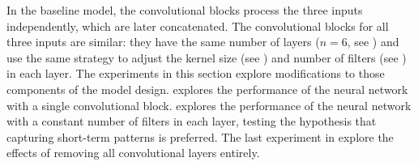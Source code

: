 
In the baseline model, the convolutional blocks process the
three inputs independently, which are later concatenated.
The convolutional blocks for all three inputs are similar:
they have the same number of layers ($n=6$, see
) and use the
same strategy to adjust the kernel size (see
) and number of filters (see
) in each layer. The
experiments in this section explore modifications to those
components of the model design.
 explores the
performance of the neural network with a single
convolutional block. 
explores the performance of the neural network with a
constant number of filters in each layer, testing the
hypothesis that capturing short-term patterns is preferred.
The last experiment in 
explore the effects of removing all convolutional layers
entirely.
